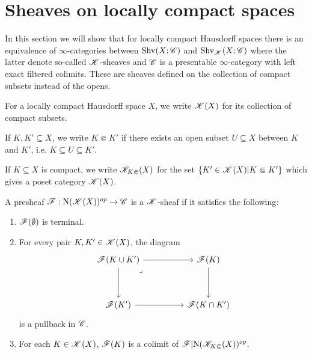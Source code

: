 \documentclass[../../thesis.tex]{subfiles}
\begin{document}
\section{Sheaves on locally compact spaces}
In this section we will show that for locally compact Hausdorff spaces there is an equivalence of $\infty$-categories between $\mathrm{Shv}(X;\mathscr{C})$ and $\mathrm{Shv}_{\mathscr{K}}(X;\mathscr{C})$ where the latter denote so-called $\mathscr{K}$-sheaves and $\mathscr{C}$ is a presentable $\infty$-category with left exact filtered colimits.
These are sheaves defined on the collection of compact subsets instead of the opens.
\begin{definition}
    For a locally compact Hausdorff space $X$, we write $\mathscr{K}(X)$ for its collection of compact subsets.
\end{definition}
\begin{definition}
    If $K, K' \subseteq X$, we write $K \Subset K'$ if there exists an open subset $U\subseteq X$ between $K$ and $K'$, i.e. $K \subseteq U \subseteq K'$.
\end{definition}
\begin{definition}
    If $K\subseteq X$ is compact, we write $\mathscr{K}_{K\Subset}(X)$ for the set $\{ K'\in \mathscr{K}(X) | K \Subset K' \}$ which gives a poset category $\mathscr{K}(X)$.
\end{definition}
\begin{definition}
    A presheaf $\mathscr{F}:\mathrm{N}(\mathscr{K}(X))^{op}\to \mathscr{C}$ is a $\mathscr{K}$-sheaf if it satisfies the following:
    \begin{enumerate}
        \item $\mathscr{F}(\emptyset)$ is terminal.
        \item For every pair $K,K'\in \mathscr{K}(X)$, the diagram
              \[\begin{tikzcd}
                      {\F(K \cup K')} && {\F(K)} \\
                      \\
                      {\F(K')} && {\F(K\cap K')}
                      \arrow[from=1-3, to=3-3]
                      \arrow[from=3-1, to=3-3]
                      \arrow[from=1-1, to=3-1]
                      \arrow["\lrcorner"{anchor=center, pos=0.125}, draw=none, from=1-1, to=3-3]
                      \arrow[from=1-1, to=1-3]
                  \end{tikzcd}\]
              is a pullback in $\mathscr{C}$.
        \item For each $K\in \mathscr{K}(X)$, $\mathscr{F}(K)$ is a colimit of $\mathscr{F}|\mathrm{N}(\mathscr{K}_{K\Subset}(X))^{op}$.
    \end{enumerate}
\end{definition}
\end{document}

